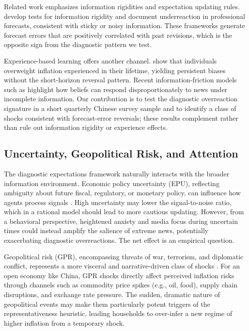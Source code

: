 \documentclass[12pt]{article}
\begin{document}
Related work emphasizes information rigidities and expectation updating rules. \cite{Coibion2015} develop tests for information rigidity and document underreaction in professional forecasts, consistent with sticky or noisy information. These frameworks generate forecast errors that are positively correlated with past revisions, which is the opposite sign from the diagnostic pattern we test.

Experience-based learning offers another channel. \cite{Malmendier2016} show that individuals overweight inflation experienced in their lifetime, yielding persistent biases without the short-horizon reversal pattern. Recent information-friction models such as \cite{Angeletos2018} highlight how beliefs can respond disproportionately to news under incomplete information. Our contribution is to test the diagnostic overreaction signature in a short quarterly Chinese survey sample and to identify a class of shocks consistent with forecast-error reversals; these results complement rather than rule out information rigidity or experience effects.

\subsection{Uncertainty, Geopolitical Risk, and Attention}
The diagnostic expectations framework naturally interacts with the broader information environment. Economic policy uncertainty (EPU), reflecting ambiguity about future fiscal, regulatory, or monetary policy, can influence how agents process signals \cite{Baker2016}. High uncertainty may lower the signal-to-noise ratio, which in a rational model should lead to more cautious updating. However, from a behavioral perspective, heightened anxiety and media focus during uncertain times could instead amplify the salience of extreme news, potentially exacerbating diagnostic overreactions. The net effect is an empirical question.

Geopolitical risk (GPR), encompassing threats of war, terrorism, and diplomatic conflict, represents a more visceral and narrative-driven class of shocks \cite{Caldara2022}. For an open economy like China, GPR shocks directly affect perceived inflation risks through channels such as commodity price spikes (e.g., oil, food), supply chain disruptions, and exchange rate pressure. The sudden, dramatic nature of geopolitical events may make them particularly potent triggers of the representativeness heuristic, leading households to over-infer a new regime of higher inflation from a temporary shock.
\end{document}
